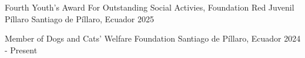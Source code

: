 

\begin{cvhonors}

  \cvhonor
    {Fourth Youth's Award} %
    {For Outstanding Social Activies, Foundation Red Juvenil Píllaro } %
    {Santiago de Píllaro, Ecuador} %
    {2025} %

  \cvhonor
    {Member of Dogs and Cats' Welfare Foundation} %
    {} %
    {Santiago de Píllaro, Ecuador} %
    {2024 - Present} %

\end{cvhonors}
